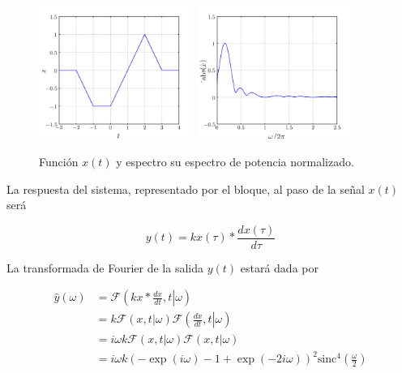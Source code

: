\documentclass[a4paper,12pt,final]{article}
\begin{document}
      \begin{figure}[H]
          \caption{Función $x\left(t\right)$ y espectro su espectro de potencia normalizado.}
          \label{script02Afigure}
          \begin{center}
              \includegraphics[width=0.45\textwidth]{./laboratorio_4/problema02_x.png}
              \includegraphics[width=0.45\textwidth]{./laboratorio_4/problema02_X.png}
          \end{center}
      \end{figure}

      \noindent La respuesta del sistema, representado por el bloque, al paso de
      la señal $x\left(t\right)$ será

      \begin{equation*}
        y\left(t\right) = k x\left(\tau\right) * \frac{d x\left(\tau\right)}{d \tau}
      \end{equation*}

      \noindent La transformada de Fourier de la salida $y\left(t\right)$ estará dada por

      \begin{equation*}
        \begin{split}
          \widehat{y}\left(\omega\right) & = \mathcal{F}\left(\left.k x * \frac{dx}{dt},t\right|\omega\right) \\
                                         & = k \mathcal{F}\left(x, t| \omega\right)\mathcal{F}\left(\left.\frac{dx}{dt},t\right|\omega\right) \\
                                         & = i \omega k\mathcal{F}\left(x,t|\omega\right) \mathcal{F}\left(x,t|\omega\right) \\
                                         & = i \omega k \left( - \exp\left(i \omega\right) - 1 + \exp\left(- 2 i \omega\right) \right)^{2} \mathrm{sinc}^{4}\left(\frac{\omega}{2}\right)
        \end{split}
      \end{equation*}
\end{document}
